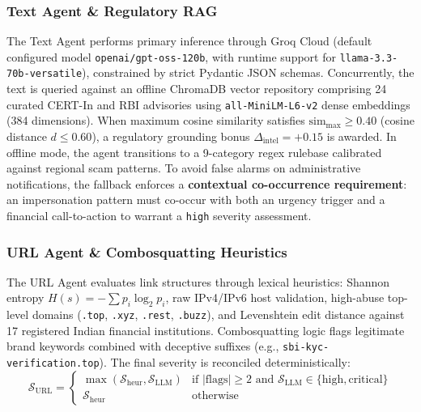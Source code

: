 \documentclass[conference]{IEEEtran}
\begin{document}
\subsubsection{Text Agent \& Regulatory RAG}
The Text Agent performs primary inference through Groq Cloud (default configured model \texttt{openai/gpt-oss-120b}, with runtime support for \texttt{llama-3.3-70b-versatile}), constrained by strict Pydantic JSON schemas. Concurrently, the text is queried against an offline ChromaDB vector repository comprising 24 curated CERT-In and RBI advisories using \texttt{all-MiniLM-L6-v2} dense embeddings (384 dimensions). When maximum cosine similarity satisfies $\text{sim}_{\max} \ge 0.40$ (cosine distance $d \le 0.60$), a regulatory grounding bonus $\Delta_{\text{intel}} = +0.15$ is awarded. In offline mode, the agent transitions to a 9-category regex rulebase calibrated against regional scam patterns. To avoid false alarms on administrative notifications, the fallback enforces a \textbf{contextual co-occurrence requirement}: an impersonation pattern must co-occur with both an urgency trigger and a financial call-to-action to warrant a \texttt{high} severity assessment.

\subsubsection{URL Agent \& Combosquatting Heuristics}
The URL Agent evaluates link structures through lexical heuristics: Shannon entropy $H(s) = -\sum p_i \log_2 p_i$, raw IPv4/IPv6 host validation, high-abuse top-level domains (\texttt{.top}, \texttt{.xyz}, \texttt{.rest}, \texttt{.buzz}), and Levenshtein edit distance against 17 registered Indian financial institutions. Combosquatting logic flags legitimate brand keywords combined with deceptive suffixes (e.g., \texttt{sbi-kyc-verification.top}). The final severity is reconciled deterministically:
\begin{equation}
\mathcal{S}_{\text{URL}} = \begin{cases} 
\max(\mathcal{S}_{\text{heur}}, \mathcal{S}_{\text{LLM}}) & \text{if } |\text{flags}| \ge 2 \text{ and } \mathcal{S}_{\text{LLM}} \in \{\text{high}, \text{critical}\} \\
\mathcal{S}_{\text{heur}} & \text{otherwise}
\end{cases}
\end{equation}
\end{document}
